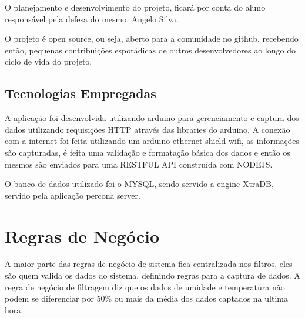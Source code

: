 O planejamento e desenvolvimento do projeto, ficará por conta do aluno responsável pela defesa do mesmo, Angelo Silva.

O projeto é open source, ou seja, aberto para a comunidade no github, recebendo então, pequenas contribuições esporádicas de outros desenvolvedores ao longo do ciclo de vida do projeto.

\subsection{Tecnologias Empregadas}

A aplicação foi desenvolvida utilizando arduino para gerenciamento e captura dos dados utilizando requisições HTTP através das libraries do arduino. A conexão com a internet foi feita utilizando um arduino ethernet shield wifi, as informações são capturadas, é feita uma validação e formatação básica dos dados e então os mesmos são enviados para uma RESTFUL API construída com NODEJS.

O banco de dados utilizado foi o MYSQL, sendo servido a engine XtraDB, servido pela aplicação percona server.

\section{Regras de Negócio}

A maior parte das regras de negócio de sistema fica centralizada nos filtros, eles são quem valida os dados do sistema, definindo regras para a captura de dados.
A regra de negócio de filtragem diz que os dados de umidade e temperatura não podem se diferenciar por 50\% ou mais da média dos dados captados na ultima hora.
